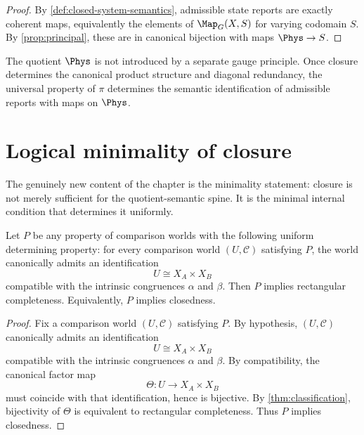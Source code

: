 \begin{proof}
	By \cref{def:closed-system-semantics}, admissible state reports are
	exactly coherent maps, equivalently the elements of \(\Map_G(X,S)\) for
	varying codomain \(S\). By \cref{prop:principal}, these are in canonical
	bijection with maps \(\Phys\to S\).
\end{proof}
\begin{remark}
	The quotient \(\Phys\) is not introduced by a separate gauge principle.
	Once closure determines the canonical product structure and diagonal
	redundancy, the universal property of \(\pi\) determines the semantic
	identification of admissible reports with maps on \(\Phys\).
\end{remark}
\section{Logical minimality of closure}
\label{sec:closure-minimality}
The genuinely new content of the chapter is the minimality statement:
closure is not merely sufficient for the quotient-semantic spine. It is
the minimal internal condition that determines it uniformly.
\begin{theorem}
	\label{thm:logical-minimality}
	Let \(P\) be any property of comparison worlds with the following
	uniform determining property:
	\medskip
	\noindent
	for every comparison world \((U,\mathcal C)\) satisfying \(P\), the
	world canonically admits an identification
	\[
		U\cong X_A\times X_B
	\]
	compatible with the intrinsic congruences \(\alpha\) and \(\beta\).
	\medskip
	\noindent
	Then \(P\) implies rectangular completeness. Equivalently, \(P\) implies
	closedness.
\end{theorem}
\begin{proof}
	Fix a comparison world \((U,\mathcal C)\) satisfying \(P\). By
	hypothesis, \((U,\mathcal C)\) canonically admits an identification
	\[
		U\cong X_A\times X_B
	\]
	compatible with the intrinsic congruences \(\alpha\) and \(\beta\). By
	compatibility, the canonical factor map
	\[
		\Theta:U\to X_A\times X_B
	\]
	must coincide with that identification, hence is bijective. By
	\cref{thm:classification}, bijectivity of \(\Theta\) is equivalent to
	rectangular completeness. Thus \(P\) implies closedness.
\end{proof}
